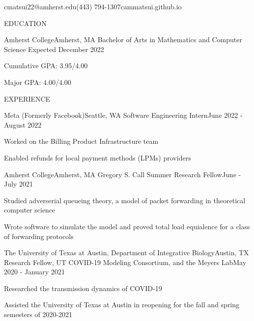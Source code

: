 \documentclass{article}
\begin{document}
\thispagestyle{empty}

        {cmatsui22@amherst.edu}{(443) 794-1307}{cammatsui.github.io}

\begin{bigsection}{EDUCATION}
    \begin{sectionitem}{Amherst College}{Amherst, MA}
            {Bachelor of Arts in Mathematics and Computer Science}
            {Expected December 2022}
        \item Cumulative GPA: 3.95/4.00
        \item Major GPA: 4.00/4.00
    \end{sectionitem}
\end{bigsection}

\begin{bigsection}{EXPERIENCE}
    \begin{sectionitem}{Meta (Formerly Facebook)}{Seattle, WA}
            {Software Engineering Intern}{June 2022 - August 2022}
        \item Worked on the Billing Product Infrastructure team
        \item Enabled refunds for local payment methods (LPMs) providers
    \end{sectionitem}

    \begin{sectionitem}{Amherst College}{Amherst, MA}
            {Gregory S. Call Summer Research Fellow}{June - July 2021}
        \item Studied adverserial queueing theory, a model of packet forwarding in theoretical computer science
        \item Wrote software to simulate the model and proved total load equialence for a class of forwarding protocols
    \end{sectionitem}

    \begin{sectionitem}{The University of Texas at Austin, Department of Integrative Biology}{Austin, TX}
            {Research Fellow, UT COVID-19 Modeling Consortium, and the Meyers Lab}{May 2020 - January 2021}
        \item Researched the transmission dynamics of COVID-19
        \item Assisted the University of Texas at Austin in reopening for the fall and spring semesters of 2020-2021
    \end{sectionitem}
\end{bigsection}
\end{document}
